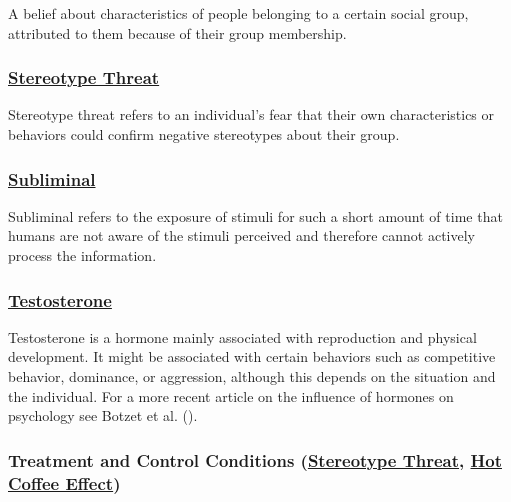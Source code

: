 \documentclass[
  letterpaper,
]{book}
\begin{document}
A belief about characteristics of people belonging to a certain social
group, attributed to them because of their group membership.

\subsubsection*{\texorpdfstring{\hyperref[def-stereotypethreat]{Stereotype
Threat}}{Stereotype Threat}}\label{stereotype-threat-1}

Stereotype threat refers to an individual's fear that their own
characteristics or behaviors could confirm negative stereotypes about
their group.

\subsubsection*{\texorpdfstring{\hyperref[def-subliminal]{Subliminal}}{Subliminal}}\label{subliminal}

Subliminal refers to the exposure of stimuli for such a short amount of
time that humans are not aware of the stimuli perceived and therefore
cannot actively process the information.

\subsubsection*{\texorpdfstring{\hyperref[def-testosterone]{Testosterone}}{Testosterone}}\label{testosterone}

Testosterone is a hormone mainly associated with reproduction and
physical development. It might be associated with certain behaviors such
as competitive behavior, dominance, or aggression, although this depends
on the situation and the individual. For a more recent article on the
influence of hormones on psychology see Botzet et al.
().

\subsubsection*{\texorpdfstring{Treatment and Control Conditions
(\hyperref[def-treatmentandcontrolconditions]{Stereotype Threat},
\hyperref[def-treatmentandcontrolconditions]{Hot Coffee
Effect})}{Treatment and Control Conditions (Stereotype Threat, Hot Coffee Effect)}}\label{treatment-and-control-conditions-stereotype-threat-hot-coffee-effect}
\end{document}
